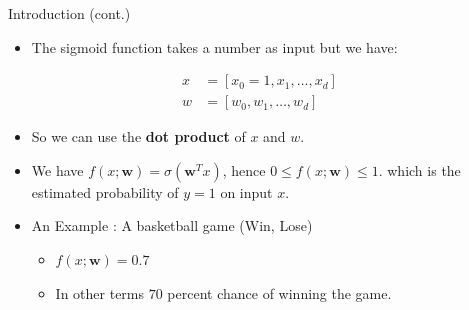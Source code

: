 \documentclass[serif, aspectratio=169]{beamer}
\begin{document}
\begin{frame}{Introduction (cont.)}
    \begin{itemize}
      \item The sigmoid function takes a number as input but we have:
    \end{itemize}
        \begin{align*}
            x &= [x_0=1,x_1, \dots, x_d] \\
            w &= [w_0, w_1, \dots, w_d]
        \end{align*}
    \begin{itemize} 
      \item So we can use the \textbf{dot product} of $x$ and $w$.
      
      \item We have $f(x;\mathbf{w}) = \sigma (\mathbf{w}^Tx)$, hence $0\leq f(x;\mathbf{w}) \leq 1$. which is the estimated probability of $y=1$ on input $x$.

      \item An Example : A basketball game (Win, Lose)
        \begin{itemize}
            \item $f(x;\mathbf{w}) = 0.7$
            \item In other terms $70$ percent chance of winning the game.
        \end{itemize}
        
    \end{itemize}
\end{frame}
\end{document}
